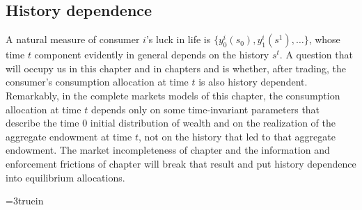\subsection{History dependence}
  A natural measure of consumer
$i$'s luck in life is  $\{y^i_0(s_0), y^i_1(s^1), \ldots \}$, whose time $t$ component
evidently in general depends on the history $s^t$. A
question that will occupy us in this chapter and in chapters
 and
 is whether, after trading, the consumer's
consumption allocation at time $t$ is also history dependent.  Remarkably, in
the complete markets models of this chapter, the consumption
allocation  at time $t$  depends only on some time-invariant parameters that describe the time $0$  initial distribution of wealth and
on the realization of the aggregate
endowment  at time $t$,  not  on the  history that led to that aggregate endowment.
 The market incompleteness of chapter
 and the  information and enforcement frictions of
chapter  will break that result and put
history dependence into equilibrium allocations.


\centerline{\epsfxsize=3truein} \caption{The
commodity space with Arrow securities.  At date $t=2$, there are
trades in time $3$ goods for only those time $t=3$ nodes that can
be reached from the realized time $t=2$ history $(0,0, 1)$.}
\endfigure

